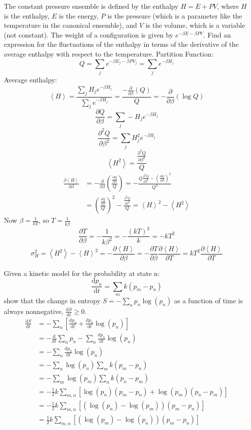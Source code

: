 \documentclass[letterpaper]{article}
\providecommand{\ainner}[1]{\left\langle#1\right\rangle}
\def\d{\mathrm{d}}
\begin{document}
\begin{multicols}{2}
The constant pressure ensemble is defined by the enthalpy $H=E+PV$, where $H$ is
the enthalpy, $E$ is the energy, $P$ is the pressure (which is a parameter like
the temperature in the canonical ensemble), and $V$ is the volume, which is a
variable (not constant). The weight of a configuration is given by $e^{-\beta
E-\beta PV}$. Find an expression for the fluctuations of the enthalpy in terms
of the derivative of the average enthalpy with respect to the temperature.
Partition Function:
\[
Q=\sum_je^{-\beta E_j-\beta PV_j}=\sum_je^{-\beta H_j}
\]
Average enthalpy:
\[
\ainner{H}=\frac{\sum_j H_j e^{-\beta H_j}}{\sum_j e^{-\beta H_j}}
=\frac{-\frac{\partial}{\partial\beta}(Q)}{Q}
=-\frac{\partial}{\partial\beta}(\log Q)
\]
\[
\frac{\partial Q}{\partial\beta}=\sum_j-H_je^{-\beta H_j}
\]
\[
\frac{\partial^2 Q}{\partial\beta^2}=\sum_j H_j^2 e^{-\beta H_j}
\]
\[
\ainner{H^2}=\frac{\frac{\partial^2 Q}{\partial\beta^2}}{Q}
\]
\begin{align*}
\frac{\partial\ainner{H}}{\partial\beta}
&=-\frac{\partial}{\partial\beta}
\left(\frac{\frac{\partial Q}{\partial\beta}}{Q}\right)
=-\frac{Q\frac{\partial^2Q}{\partial\beta^2}-\left(\frac{\partial
Q}{\partial\beta}\right)^2}{Q^2}\\
&=\left(\frac{\frac{\partial
Q}{\partial\beta}}{Q}\right)^2-\frac{\frac{\partial^2Q}{\partial\beta^2}}{Q}
=\ainner{H}^2-\ainner{H^2}
\end{align*}
Now $\beta=\frac{1}{kT}$, so $T=\frac{1}{k\beta}$
\[
\frac{\partial T}{\partial\beta}=-\frac{1}{k\beta^2}=-\frac{(kT)^2}{k}=-kT^2
\]
\[
\sigma^2_H=\ainner{H^2}-\ainner{H}^2=-\frac{\partial\ainner{H}}{\partial\beta}
=-\frac{\partial T}{\partial\beta}\frac{\partial\ainner{H}}{\partial T}
=kT^2\frac{\partial\ainner{H}}{\partial T}
\]

 Given a kinetic model for the probability at state n:
\[
\frac{\d p_n}{\d t}=\sum_m k(p_m-p_n)
\]
show that the change in entropy $S=-\sum_n p_n\log(p_n)$ as a function of time
is always nonnegative, $\frac{\d S}{\d t}\ge0$.
\begin{align*}
\frac{\d S}{\d t}&=-\sum_n\left[\frac{\d p_n}{\d t}+\frac{\d p_n}{\d
t}\log(p_n)\right]\\
&=-\frac{\d}{\d t}\sum_n p_n
-\sum_n\frac{\d p_n}{\d t}\log(p_n)\\
&=-\sum_n\frac{\d p_n}{\d t}\log(p_n)\\
&=-\sum_n\log(p_n)\sum_mk(p_m-p_n)\\
&=-\sum_m\log(p_m)\sum_nk(p_n-p_m)\\
&=-\frac{1}{2}k\sum_{m,n}[\log(p_n)(p_m-p_n)+\log(p_m)(p_n-p_m)]\\
&=-\frac{1}{2}k\sum_{m,n}[(\log(p_n)-\log(p_m))(p_m-p_n)]\\
&=\frac{1}{2}k\sum_{m,n}[(\log(p_m)-\log(p_n))(p_m-p_n)]\\
\end{align*}


\end{multicols}
\end{document}

